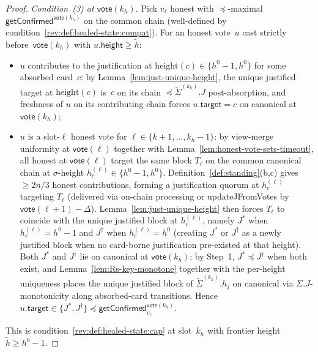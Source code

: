 \ifx\litemode\undefined\documentclass{article}\fi
\newcommand{\target}{\mathsf{target}}
\newcommand{\height}{\mathsf{height}}
\newcommand{\updateJFromVotes}{\textsf{updateJFromVotes}\xspace}
\newcommand{\vote}{\ensuremath{\mathsf{vote}}}
\newcommand{\comm}[1]{\ensuremath{\widetilde{#1}}}
\newcommand{\getConfirmed}{\textsf{getConfirmed}\xspace}
\theoremstyle{plain}
\theoremstyle{definition}
\theoremstyle{remark}
\begin{document}
\begin{proof}
\emph{Condition~(3) at $\vote(k_h)$.}
Pick $v_\ell$ honest with $\preceq$-maximal $\getConfirmed^{\vote(k_h)}$ on the common chain (well-defined by condition~\ref{rev:def:healed-state:compat}).
For an honest vote~$u$ cast strictly before~$\vote(k_h)$ with $u.\height \geq \comm{h}$:
\begin{itemize}
  \item $u$ contributes to the justification at $\mathrm{height}(c) \in \{h^0 - 1, h^0\}$ for some absorbed card~$c$: by Lemma~\ref{lem:just-unique-height}, the unique justified target at $\mathrm{height}(c)$ is~$c$ on its chain $\preceq \comm{\Sigma}^{(k_h)}.J$ post-absorption, and freshness of $u$ on its contributing chain forces $u.\target = c$ on canonical at $\vote(k_h)$;
  \item $u$ is a slot-$\ell$ honest vote for $\ell \in \{k+1, \ldots, k_h - 1\}$: by view-merge uniformity at $\vote(\ell)$ together with Lemma~\ref{lem:honest-vote-sets-timeout}, all honest at $\vote(\ell)$ target the same block $T_\ell$ on the common canonical chain at $\sigma$-height $h_c^{(\ell)} \in \{h^0 - 1, h^0\}$.
  Definition~\ref{def:standing}(b,c) gives $\geq 2n/3$ honest contributions, forming a justification quorum at $h_c^{(\ell)}$ targeting $T_\ell$ (delivered via on-chain processing or \updateJFromVotes{} by $\vote(\ell+1) - \Delta$).
  Lemma~\ref{lem:just-unique-height} then forces $T_\ell$ to coincide with the unique justified block at $h_c^{(\ell)}$, namely $J^*$ when $h_c^{(\ell)} = h^0 - 1$ and $J^\dagger$ when $h_c^{(\ell)} = h^0$ (creating $J^*$ or $J^\dagger$ as a newly justified block when no card-borne justification pre-existed at that height).
  Both $J^*$ and $J^\dagger$ lie on canonical at $\vote(k_h)$: by Step~1, $J^* \preceq J^\dagger$ when both exist, and Lemma~\ref{lem:Rs-key-monotone} together with the per-height uniqueness places the unique justified block of $\comm{\Sigma}^{(k_h)}.h_j$ on canonical via $\Sigma.J$-monotonicity along absorbed-card transitions.
  Hence $u.\target \in \{J^*, J^\dagger\} \preceq \getConfirmed_{v_\ell}^{\vote(k_h)}$.
\end{itemize}
This is condition~\ref{rev:def:healed-state:cap} at slot~$k_h$ with frontier height $\comm{h} \geq h^0 - 1$.
\end{proof}
\fi
\end{document}
